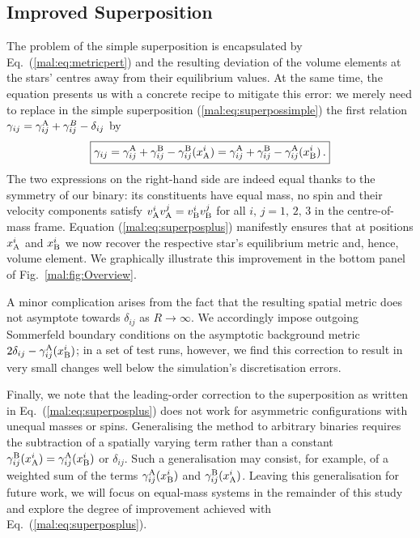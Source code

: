\subsection{Improved Superposition} \label{mal:sec:improvedsuperposition}
%
The problem of the simple superposition is encapsulated
by Eq.~(\ref{mal:eq:metricpert}) and the resulting deviation
of the volume elements at the stars' centres away from their
equilibrium values. At the same time, the equation presents us
with a concrete recipe to mitigate this error: we merely need
to replace in the simple superposition (\ref{mal:eq:superpossimple})
the first relation $\gamma_{ij}=\gamma_{ij}^{\rm A}+\gamma_{ij}^B
-\delta_{ij}$ by
%
\begin{equation}
  \boxed{
  \gamma_{ij}=\gamma_{ij}^{\rm A}+\gamma_{ij}^{\rm B}
  -\gamma_{ij}^{\rm B}(x^i_{\rm A})
  =\gamma_{ij}^{\rm A}+\gamma_{ij}^{\rm B}
  -\gamma_{ij}^{\rm A}(x^i_{\rm B})\,.}
  \label{mal:eq:superposplus}
\end{equation}
%
The two expressions on the right-hand side are indeed equal thanks
to the symmetry of our binary: its constituents have equal mass,
no spin and their velocity components satisfy
$v_{\rm A}^i v_{\rm A}^j=v_{\rm B}^i v_{\rm B}^j$ for all
$i,\,j=1,\,2,\,3$ in the centre-of-mass frame.
Equation (\ref{mal:eq:superposplus}) manifestly ensures that at
positions $x_{\rm A}^i$ and $x_{\rm B}^i$ we now recover
the respective star's equilibrium metric and, hence, volume element.
We graphically illustrate this improvement in the bottom panel
of Fig.~\ref{mal:fig:Overview}.

A minor complication arises from the fact that the resulting
spatial metric does not asymptote towards $\delta_{ij}$
as $R\rightarrow \infty$. We accordingly impose
outgoing Sommerfeld boundary conditions on the asymptotic
background metric $2\delta_{ij}-\gamma_{ij}^{\rm A}(x^i_{\rm B})$;
in a set of test runs, however, we find this correction to result
in very small changes well below the simulation's discretisation errors.

Finally, we note that the leading-order correction to the superposition
as written in Eq.~(\ref{mal:eq:superposplus}) does not work for asymmetric
configurations with unequal masses or spins. Generalising the method
to arbitrary binaries requires the subtraction of
a spatially varying term rather than a constant
$\gamma_{ij}^{\rm B}(x^i_{\rm A})=\gamma_{ij}^{\rm A}(x^i_{\rm B})$
or $\delta_{ij}$. Such a generalisation may consist, for example,
of a weighted sum of the terms $\gamma_{ij}^{\rm A}(x^i_{\rm B})$
and $\gamma_{ij}^{\rm B}(x^i_{\rm A})$. Leaving this
generalisation for future work, we will focus on equal-mass
systems in the remainder of this study and explore
the degree of improvement achieved with
Eq.~(\ref{mal:eq:superposplus}).

